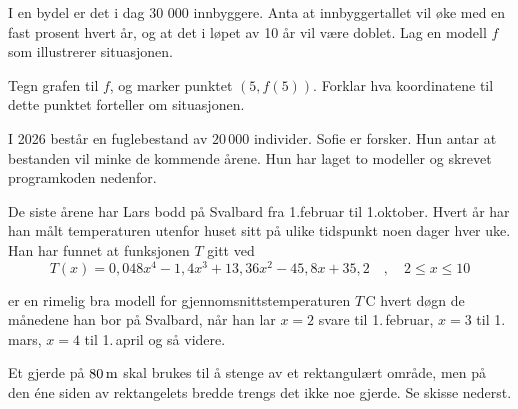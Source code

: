 I en bydel er det i dag 30 000 innbyggere. Anta at innbyggertallet vil øke med en fast
prosent hvert år, og at det i løpet av 10 år vil være doblet.
Lag en modell $f$ som illustrerer situasjonen. \os

Tegn grafen til $f$, og marker punktet $(5, f(5))$. Forklar hva koordinatene til dette
punktet forteller om situasjonen.

I 2026 består en fuglebestand av $20\,000$ individer. Sofie er forsker. Hun antar at bestanden vil minke de kommende årene. Hun har laget to modeller og skrevet programkoden nedenfor.

De siste årene har Lars bodd på Svalbard fra 1.februar til 1.oktober.
Hvert år har han målt temperaturen utenfor huset sitt på ulike tidspunkt
noen dager hver uke. Han har funnet at funksjonen $T$ gitt ved
{\small\[
T(x) = 0,048x^4 - 1,4x^3 + 13,36x^2 - 45,8x + 35,2\quad, \quad 2 \le x \le 10
\]}

er en rimelig bra modell for gjennomsnittstemperaturen $T$\,\textdegree C
hvert døgn de månedene han bor på Svalbard, når han lar $x=2$ svare til
1.\,februar, $x=3$ til 1.\,mars, $x=4$ til 1.\,april og så videre.


Et gjerde på $80\,\text{m}$ skal brukes til å stenge av et rektangulært område, men på den éne siden av rektangelets bredde trengs det ikke noe gjerde. Se skisse nederst.

